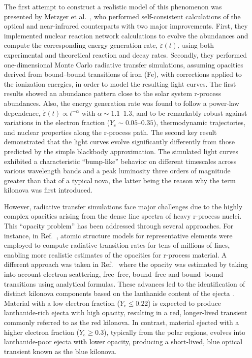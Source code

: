 The first attempt to construct a realistic model of this phenomenon was presented by Metzger et al.~\cite{metzger_electromagnetic_2010}, who performed self-consistent calculations of the optical and near-infrared counterparts with two major improvements.
First, they implemented nuclear reaction network calculations to evolve the abundances and compute the corresponding energy generation rate, $\dot{\varepsilon}(t)$, using both experimental and theoretical reaction and decay rates.
Secondly, they performed one-dimensional Monte Carlo radiative transfer simulations, assuming opacities derived from bound–bound transitions of iron (Fe), with corrections applied to the ionization energies, in order to model the resulting light curves.
The first results showed an abundance pattern close to the solar system r-process abundances.
Also, the energy generation rate was found to follow a power-law dependence, $\dot \varepsilon(t) \propto t^{-\alpha}$ with $\alpha \sim 1.1$--$1.3$, and to be remarkably robust against variations in the electron fraction ($Y_e \sim 0.05$--$0.35$), thermodynamic trajectories, and nuclear properties along the r-process path.
The second key result demonstrated that the light curves evolve significantly differently from those predicted by the simple blackbody approximation.
The simulated light curves exhibited a characteristic “bump-like” behavior on different timescales across various wavelength bands and a peak luminosity three orders of magnitude greater than that of a typical nova, the latter being the reason why the term kilonova was first introduced.


However, radiative transfer simulations face major challenges due to the highly complex opacities arising from the dense line spectra of heavy r-process nuclei.
This “opacity problem” has been addressed through several approaches.
For instance, in Ref.~\cite{kasen_opacities_2013}, atomic structure models for representative elements were employed to compute radiative transition rates for tens of millions of lines, enabling more realistic estimates of the opacities for r-process material.
A different approach was taken in Ref.~\cite{tanaka_radiative_2013} where the opacity was estimated by taking into account electron scattering, free--free, bound--free and bound--bound transitions using analytical formulas.
These advances led to the identification of distinct kilonova components based on the lanthanide content of the ejecta \cite{barnes_effect_2013,lippuner_r-process_2015}.
Material with a low electron fraction ($Y_e \le 0.22$) is expected to produce lanthanide-rich ejecta with high opacity, resulting in a red, longer-lived transient commonly referred to as the red kilonova.
In contrast, material ejected with a higher electron fraction ($Y_e \ge 0.3$), typically from the polar regions, evolves into lanthanide-poor ejecta with lower opacity, producing a short-lived, blue optical transient known as the blue kilonova.

